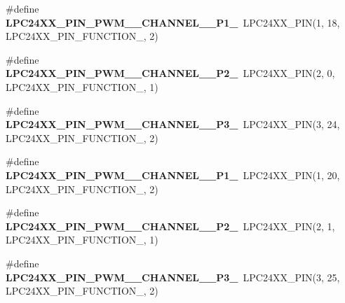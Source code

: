 \begin{DoxyCompactItemize}
\item 
\mbox{\label{group__lpc24xx__io_gaeb4bf164ec1284238697c6774447b313}} 
\#define {\bfseries L\+P\+C24\+X\+X\+\_\+\+P\+I\+N\+\_\+\+P\+W\+M\+\_\+\_\+\+C\+H\+A\+N\+N\+E\+L\+\_\+\_\+\+P1\+\_}~L\+P\+C24\+X\+X\+\_\+\+P\+IN(1, 18, L\+P\+C24\+X\+X\+\_\+\+P\+I\+N\+\_\+\+F\+U\+N\+C\+T\+I\+O\+N\+\_, 2)
\item 
\mbox{\label{group__lpc24xx__io_gaf9266d4370dad7f4639f1a8e4bafa982}} 
\#define {\bfseries L\+P\+C24\+X\+X\+\_\+\+P\+I\+N\+\_\+\+P\+W\+M\+\_\+\_\+\+C\+H\+A\+N\+N\+E\+L\+\_\+\_\+\+P2\+\_}~L\+P\+C24\+X\+X\+\_\+\+P\+IN(2, 0, L\+P\+C24\+X\+X\+\_\+\+P\+I\+N\+\_\+\+F\+U\+N\+C\+T\+I\+O\+N\+\_, 1)
\item 
\mbox{\label{group__lpc24xx__io_ga8317e35355bfbc2f25e77287e25be4f3}} 
\#define {\bfseries L\+P\+C24\+X\+X\+\_\+\+P\+I\+N\+\_\+\+P\+W\+M\+\_\+\_\+\+C\+H\+A\+N\+N\+E\+L\+\_\+\_\+\+P3\+\_}~L\+P\+C24\+X\+X\+\_\+\+P\+IN(3, 24, L\+P\+C24\+X\+X\+\_\+\+P\+I\+N\+\_\+\+F\+U\+N\+C\+T\+I\+O\+N\+\_, 2)
\item 
\mbox{\label{group__lpc24xx__io_gad6bbe80a73df933f06ff38e73f3435d3}} 
\#define {\bfseries L\+P\+C24\+X\+X\+\_\+\+P\+I\+N\+\_\+\+P\+W\+M\+\_\+\_\+\+C\+H\+A\+N\+N\+E\+L\+\_\+\_\+\+P1\+\_}~L\+P\+C24\+X\+X\+\_\+\+P\+IN(1, 20, L\+P\+C24\+X\+X\+\_\+\+P\+I\+N\+\_\+\+F\+U\+N\+C\+T\+I\+O\+N\+\_, 2)
\item 
\mbox{\label{group__lpc24xx__io_ga95b4ca451082e393bc3419394854d604}} 
\#define {\bfseries L\+P\+C24\+X\+X\+\_\+\+P\+I\+N\+\_\+\+P\+W\+M\+\_\+\_\+\+C\+H\+A\+N\+N\+E\+L\+\_\+\_\+\+P2\+\_}~L\+P\+C24\+X\+X\+\_\+\+P\+IN(2, 1, L\+P\+C24\+X\+X\+\_\+\+P\+I\+N\+\_\+\+F\+U\+N\+C\+T\+I\+O\+N\+\_, 1)
\item 
\mbox{\label{group__lpc24xx__io_ga7de248a2fb389b8d9256d7ceef72f688}} 
\#define {\bfseries L\+P\+C24\+X\+X\+\_\+\+P\+I\+N\+\_\+\+P\+W\+M\+\_\+\_\+\+C\+H\+A\+N\+N\+E\+L\+\_\+\_\+\+P3\+\_}~L\+P\+C24\+X\+X\+\_\+\+P\+IN(3, 25, L\+P\+C24\+X\+X\+\_\+\+P\+I\+N\+\_\+\+F\+U\+N\+C\+T\+I\+O\+N\+\_, 2)
\item 

\end{DoxyCompactItemize}
